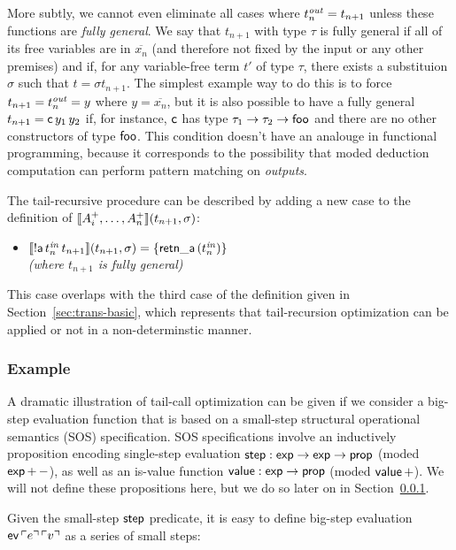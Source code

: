 More subtly, we cannot even eliminate all cases where $t^{\it out}_n =
t_{n+1}$ unless these functions are {\it fully general}. We say that
$t_{n+1}$ with type $\tau$ is fully general if all of its free
variables are in $\overline{x_n}$ (and therefore not fixed by the
input or any other premises) and if, for any variable-free term $t'$
of type $\tau$, there exists a substituion $\sigma$ such that $t =
{\sigma}t_{n+1}$. The simplest example way to do this is to force
$t_{n+1} = t^{\it out}_n = y$ where $y = \overline{x_n}$, but it is
also possible to have a fully general $t_{n+1} = {\sf c}\,y_1\,y_2$
if, for instance, ${\sf c}$ has type $\tau_1 \rightarrow \tau_2
\rightarrow {\sf foo}$ and there are no other constructors of type
${\sf foo}$. This condition doesn't have an analouge in functional
programming, because it corresponds to the possibility that 
moded deduction computation can perform pattern matching on 
{\it outputs}.

The tail-recursive procedure can be described by adding a new 
case to the definition of 
$\llbracket {A^+_i,\ldots,A^+_n} \rrbracket({t_{n+1}},{\sigma})$:

\begin{itemize}
\item $\llbracket {{!}{\sf a}\,t^{\it in}_n\,t_{n+1}} \rrbracket({t_{n+1}},{\sigma}) 
  = \{{\sf retn\_a}\,(t^{\it in}_n)\}$
\\
  {\it (where $t_{n+1}$ is fully general)}
\end{itemize}
This case overlaps with the third case of the definition given
in Section~\ref{sec:trans-basic}, which represents that tail-recursion
optimization can be applied or not in a non-determinstic manner.

\subsubsection{Example}

A dramatic illustration of tail-call optimization can be given if we
consider a big-step evaluation function that is based on a small-step
structural operational semantics (SOS) specification. SOS
specifications involve an inductively proposition encoding single-step
evaluation ${\sf step} : {\sf exp} \rightarrow {\sf exp} \rightarrow
{\sf prop}$ (moded ${\sf exp}\,{+}\,{-}$), as well as an is-value
function ${\sf value} : {\sf exp} \rightarrow {\sf prop}$ (moded ${\sf
  value}\,{+}$). We will not define these propositions here, but 
we do so later on in Section~\ref{}.

Given the small-step ${\sf step}$ predicate, it is easy to define 
big-step evaluation ${\sf ev}\,{\ulcorner{e}\urcorner}\,{\ulcorner{v}\urcorner}$ as a series of
small steps:

